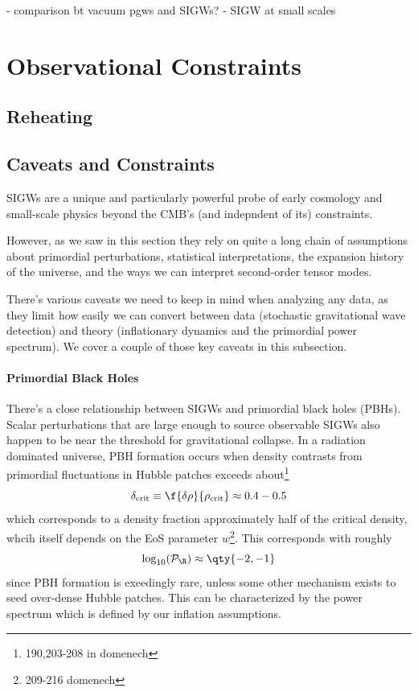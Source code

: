 

- comparison bt vacuum pgws and SIGWs?
- SIGW at small scales

\section{Observational Constraints}
\subsection{Reheating}



\subsection{Caveats and Constraints}

SIGWs are a unique and particularly powerful probe of early cosmology and small-scale physics beyond the CMB's (and indepndent of its) constraints.

However, as we saw in this section they rely on quite a long chain of assumptions about primordial perturbations, statistical interpretations, the expansion history of the universe, and the ways we can interpret second-order tensor modes.

There's various caveats we need to keep in mind when analyzing any data, as they limit how easily we can convert between data (stochastic gravitational wave detection) and theory (inflationary dynamics and the primordial power spectrum). We cover a couple of those key caveats in this subsection.

\paragraph{Primordial Black Holes}

There's a close relationship between SIGWs and primordial black holes (PBHs). Scalar perturbations that are large enough to source observable SIGWs also happen to be near the threshold for gravitational collapse. In a radiation dominated universe, PBH formation occurs when density contrasts from primordial fluctuations in Hubble patches exceeds about\footnote{190,203-208 in domenech}
$$\delta_{\rm crit}\equiv \f{\delta\rho}{\rho_{\rm crit}}\approx 0.4-0.5$$
which corresponds to a density fraction approximately half of the critical density, whcih itself depends on the EoS parameter $w$\footnote{209-216 domenech}. This corresponds with roughly
$$
\log_{10}(\mathcal{P}_{\R})\approx \qty{-2,-1}$$
since PBH formation is exeedingly rare, unless some other mechanism exists to seed over-dense Hubble patches. This can be characterized by the power spectrum which is defined by our inflation assumptions.

